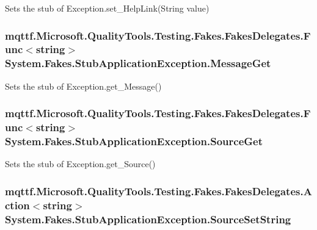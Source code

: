 Sets the stub of Exception.\-set\-\_\-\-Help\-Link(\-String value)

\hypertarget{class_system_1_1_fakes_1_1_stub_application_exception_ad9761ed860285889cce5fe0880e2c752}{
\subsubsection[{Message\-Get}]{\setlength{\rightskip}{0pt plus 5cm}mqttf.\-Microsoft.\-Quality\-Tools.\-Testing.\-Fakes.\-Fakes\-Delegates.\-Func$<$string$>$ System.\-Fakes.\-Stub\-Application\-Exception.\-Message\-Get}}\label{class_system_1_1_fakes_1_1_stub_application_exception_ad9761ed860285889cce5fe0880e2c752}


Sets the stub of Exception.\-get\-\_\-\-Message()

\hypertarget{class_system_1_1_fakes_1_1_stub_application_exception_aed67364eb61074d6987992647ea296e6}{
\subsubsection[{Source\-Get}]{\setlength{\rightskip}{0pt plus 5cm}mqttf.\-Microsoft.\-Quality\-Tools.\-Testing.\-Fakes.\-Fakes\-Delegates.\-Func$<$string$>$ System.\-Fakes.\-Stub\-Application\-Exception.\-Source\-Get}}\label{class_system_1_1_fakes_1_1_stub_application_exception_aed67364eb61074d6987992647ea296e6}


Sets the stub of Exception.\-get\-\_\-\-Source()

\hypertarget{class_system_1_1_fakes_1_1_stub_application_exception_af3bbd78c5837d7c3c044019ae8680553}{
\subsubsection[{Source\-Set\-String}]{\setlength{\rightskip}{0pt plus 5cm}mqttf.\-Microsoft.\-Quality\-Tools.\-Testing.\-Fakes.\-Fakes\-Delegates.\-Action$<$string$>$ System.\-Fakes.\-Stub\-Application\-Exception.\-Source\-Set\-String}}\label{class_system_1_1_fakes_1_1_stub_application_exception_af3bbd78c5837d7c3c044019ae8680553}


